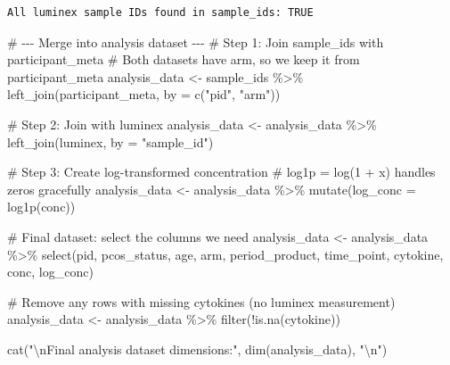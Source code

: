 \documentclass[
  letterpaper,
  DIV=11,
  numbers=noendperiod]{scrartcl}
\newenvironment{Shaded}{\begin{snugshade}}{\end{snugshade}}
\newcommand{\AttributeTok}[1]{\textcolor[rgb]{0.40,0.45,0.13}{#1}}
\newcommand{\CommentTok}[1]{\textcolor[rgb]{0.37,0.37,0.37}{#1}}
\newcommand{\FunctionTok}[1]{\textcolor[rgb]{0.28,0.35,0.67}{#1}}
\newcommand{\NormalTok}[1]{\textcolor[rgb]{0.00,0.23,0.31}{#1}}
\newcommand{\OtherTok}[1]{\textcolor[rgb]{0.00,0.23,0.31}{#1}}
\newcommand{\SpecialCharTok}[1]{\textcolor[rgb]{0.37,0.37,0.37}{#1}}
\newcommand{\StringTok}[1]{\textcolor[rgb]{0.13,0.47,0.30}{#1}}
\begin{document}
\begin{verbatim}
All luminex sample IDs found in sample_ids: TRUE 
\end{verbatim}

\begin{Shaded}
\begin{Highlighting}[]
\CommentTok{\# {-}{-}{-} Merge into analysis dataset {-}{-}{-}}
\CommentTok{\# Step 1: Join sample\_ids with participant\_meta}
\CommentTok{\# Both datasets have \textquotesingle{}arm\textquotesingle{}, so we keep it from participant\_meta}
\NormalTok{analysis\_data }\OtherTok{\textless{}{-}}\NormalTok{ sample\_ids }\SpecialCharTok{\%\textgreater{}\%}
  \FunctionTok{left\_join}\NormalTok{(participant\_meta, }\AttributeTok{by =} \FunctionTok{c}\NormalTok{(}\StringTok{"pid"}\NormalTok{, }\StringTok{"arm"}\NormalTok{))}

\CommentTok{\# Step 2: Join with luminex}
\NormalTok{analysis\_data }\OtherTok{\textless{}{-}}\NormalTok{ analysis\_data }\SpecialCharTok{\%\textgreater{}\%}
  \FunctionTok{left\_join}\NormalTok{(luminex, }\AttributeTok{by =} \StringTok{"sample\_id"}\NormalTok{)}

\CommentTok{\# Step 3: Create log{-}transformed concentration}
\CommentTok{\# log1p = log(1 + x) handles zeros gracefully}
\NormalTok{analysis\_data }\OtherTok{\textless{}{-}}\NormalTok{ analysis\_data }\SpecialCharTok{\%\textgreater{}\%}
  \FunctionTok{mutate}\NormalTok{(}\AttributeTok{log\_conc =} \FunctionTok{log1p}\NormalTok{(conc))}

\CommentTok{\# Final dataset: select the columns we need}
\NormalTok{analysis\_data }\OtherTok{\textless{}{-}}\NormalTok{ analysis\_data }\SpecialCharTok{\%\textgreater{}\%}
  \FunctionTok{select}\NormalTok{(pid, pcos\_status, age, arm, period\_product, time\_point,}
\NormalTok{         cytokine, conc, log\_conc)}

\CommentTok{\# Remove any rows with missing cytokines (no luminex measurement)}
\NormalTok{analysis\_data }\OtherTok{\textless{}{-}}\NormalTok{ analysis\_data }\SpecialCharTok{\%\textgreater{}\%}
  \FunctionTok{filter}\NormalTok{(}\SpecialCharTok{!}\FunctionTok{is.na}\NormalTok{(cytokine))}

\FunctionTok{cat}\NormalTok{(}\StringTok{"}\SpecialCharTok{\textbackslash{}n}\StringTok{Final analysis dataset dimensions:"}\NormalTok{, }\FunctionTok{dim}\NormalTok{(analysis\_data), }\StringTok{"}\SpecialCharTok{\textbackslash{}n}\StringTok{"}\NormalTok{)}
\end{Highlighting}
\end{Shaded}
\end{document}
